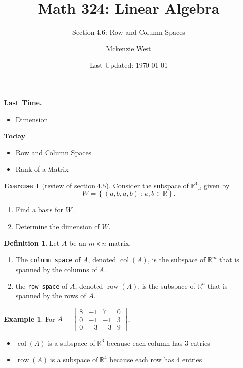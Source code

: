 \documentclass{beamer}
\newcommand{\R}{\mathbb{R}}
\newcommand{\fn}{\insertframenumber}
\newcommand{\col}{\operatorname{col}}
\newcommand{\row}{\operatorname{row}}
\theoremstyle{definition}
\newtheorem{exercise}{Exercise}
\newtheorem*{defn}{Definition}
\newtheorem*{exa}{Example}
\renewcommand{\emph}[1]{{\color{blue}\texttt{#1}}}
\begin{document}
	\title{Math 324: Linear Algebra}
	\subtitle{Section 4.6: Row and Column Spaces}
	\author{Mckenzie West}
	\date{Last Updated: \today}
\begin{frame}
\maketitle
\end{frame}

\begin{frame}{\insertframenumber}
	\begin{block}{\textbf{Last Time.}}
	\begin{itemize}[label=--]
		\item Dimension
	\end{itemize}
	\end{block}
	\begin{block}{\textbf{Today.}}
		\begin{itemize}[label=--]
			\item Row and Column Spaces
			\item Rank of a Matrix
		\end{itemize}
	\end{block}
\end{frame}
\begin{frame}{\fn}
	\begin{exercise}[review of section 4.5]
		Consider the subspace of $\R^4\underline{}$, given by
			\[W=\left\{(a,b,a,b)\ :\ a,b\in\R\right\}.\]
		\begin{enumerate}[label=(\alph*)]
			\item Find a basis for $W$.
			\item Determine the dimension of $W$.
		\end{enumerate}
	\end{exercise}
\end{frame}
\begin{frame}{\fn}
	\begin{defn}
		Let $A$ be an $m\times n$ matrix.
		\begin{enumerate}[label=\textbf{\arabic*.}]
			\item The \emph{column space} of $A$, denoted $\col(A)$, is the subspace of $\R^m$ that is spanned by the columns of $A$.
			\item the \emph{row space} of $A$, denoted $\row(A)$, is the subspace of $\R^n$ that is spanned by the rows of $A$.
		\end{enumerate}
	\end{defn}
	\begin{exa}
		For $A=\begin{bmatrix}
			8 & -1 & 7 & 0 \\
			0 & -1 & -1 & 3 \\
			0 & -3 & -3 & 9
			\end{bmatrix}$,
		\begin{itemize}[label=--]
			\item $\col(A)$ is a subspace of $\R^3$ because each column has 3 entries
			\item  $\row(A)$ is a subspace of $\R^4$ because each row has 4 entries
		\end{itemize}
	\end{exa}
\end{frame}
\end{document}
